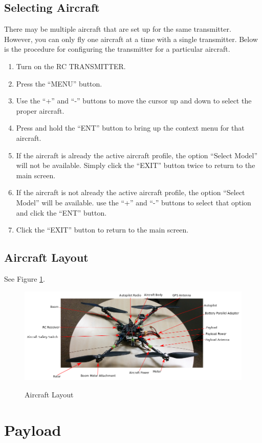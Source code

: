 \documentclass{report}
\begin{document}
			\subsection{Selecting Aircraft}
				There may be multiple aircraft that are set up for the same transmitter.  However, you can only fly one aircraft at a time with a single transmitter.  Below is the procedure for configuring the transmitter for a particular aircraft.
				\begin{enumerate}
					\item Turn on the RC TRANSMITTER.
					\item Press the ``MENU'' button.
					\item Use the ``+'' and ``-'' buttons to move the cursor up and down to select the proper aircraft.
					\item Press and hold the ``ENT'' button to bring up the context menu for that aircraft.
					\item If the aircraft is already the active aircraft profile, the option ``Select Model'' will not be available.  Simply click the ``EXIT'' button twice to return to the main screen.
					\item If the aircraft is not already the active aircraft profile, the option ``Select Model'' will be available.  use the ``+'' and ``-'' buttons to select that option and click the ``ENT'' button.
					\item Click the ``EXIT'' button to return to the main screen.
				\end{enumerate}
		\subsection{Aircraft Layout}
			See Figure \ref{fig:copter_layout}.
			\begin{figure}[ht]
				\centering
				\caption{Aircraft Layout}
				\includegraphics[width=\textwidth]{copter_layout.png}
				\label{fig:copter_layout}
			\end{figure}
	\section{Payload}
\end{document}
